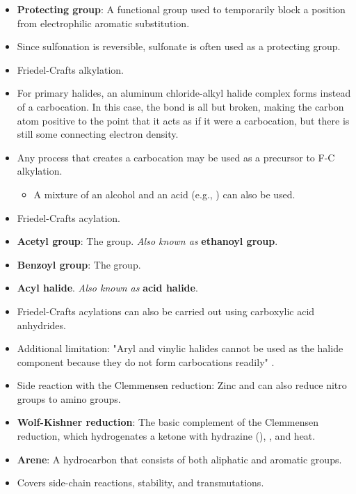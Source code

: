 \documentclass[../notes.tex]{subfiles}
\begin{document}
\begin{itemize}
\begin{itemize}
    \end{itemize}
    \item \textbf{Protecting group}: A functional group used to temporarily block a position from electrophilic aromatic substitution.
    \item Since sulfonation is reversible, sulfonate is often used as a protecting group.
    \item Friedel-Crafts alkylation.
    \item For primary halides, an aluminum chloride-alkyl halide complex forms instead of a carbocation. In this case, the  bond is all but broken, making the carbon atom positive to the point that it acts as if it were a carbocation, but there is still some connecting electron density.
    \item Any process that creates a carbocation may be used as a precursor to F-C alkylation.
    \begin{itemize}
        \item A mixture of an alcohol and an acid (e.g., ) can also be used.
    \end{itemize}
    \item Friedel-Crafts acylation.
    \item \textbf{Acetyl group}: The  group. \emph{Also known as} \textbf{ethanoyl group}.
    \item \textbf{Benzoyl group}: The  group.
    \item \textbf{Acyl halide}. \emph{Also known as} \textbf{acid halide}.
    \item Friedel-Crafts acylations can also be carried out using carboxylic acid anhydrides.
    \item Additional limitation: "Aryl and vinylic halides cannot be used as the halide component because they do not form carbocations readily" \parencite[672]{bib:SolomonsEtAl}.
    \item Side reaction with the Clemmensen reduction: Zinc and  can also reduce nitro groups to amino groups.
    \item \textbf{Wolf-Kishner reduction}: The basic complement of the Clemmensen reduction, which hydrogenates a ketone with hydrazine (), , and heat.
    \item \textbf{Arene}: A hydrocarbon that consists of both aliphatic and aromatic groups.
    \item Covers side-chain reactions, stability, and transmutations.
\end{itemize}
\end{document}
